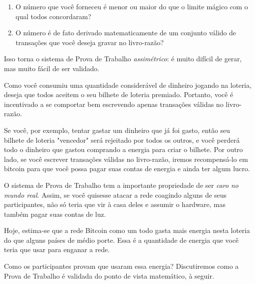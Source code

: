 \begin{samepage}
\begin{enumerate}
\item O número que você forneceu é menor ou maior do que o limite mágico com o qual todos concordaram?
\item O número é de fato derivado matematicamente de um conjunto válido de transações que você deseja gravar no livro-razão?
\end{enumerate}
\end{samepage}

Isso torna o sistema de Prova de Trabalho \textit{assimétrico}: é muito difícil de gerar, mas muito fácil de ser validado.

Como você consumiu uma quantidade considerável de dinheiro jogando na loteria, deseja que todos aceitem o seu bilhete de loteria premiado. Portanto, você é incentivado a se comportar bem escrevendo apenas transações válidas no livro-razão.

Se você, por exemplo, tentar gastar um dinheiro que já foi gasto, então seu bilhete de loteria "vencedor" será rejeitado por todos os outros, e você perderá todo o dinheiro que gastou comprando a energia para criar o bilhete. Por outro lado, se você escrever transações válidas no livro-razão, iremos recompensá-lo em bitcoin para que você possa pagar suas contas de energia e ainda ter algum lucro.

O sistema de Prova de Trabalho tem a importante propriedade de ser \textit{caro no mundo real}. Assim, se você quisesse atacar a rede coagindo alguns de seus participantes, não só teria que vir à casa deles e assumir o hardware, mas também pagar suas contas de luz.

Hoje, estima-se que a rede Bitcoin como um todo gasta mais energia nesta loteria do que alguns países de médio porte. Essa é a quantidade de energia que você teria que usar para enganar a rede.

Como os participantes provam que usaram essa energia? Discutiremos como a Prova de Trabalho é validada do ponto de vista matemático, à seguir.